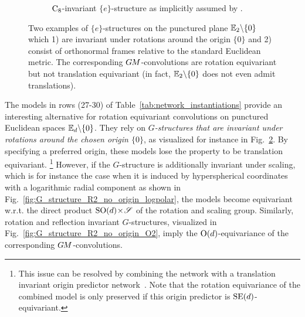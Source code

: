 \begin{figure}
\begin{subfigure}[b]{0.47\textwidth}
        \caption{\small
            $\operatorname{C}_{8}$-invariant $\{e\}$-structure as implicitly assumed by \citet{chidester2019rotation}.
        }
        \label{fig:G_structure_R2_no_origin_C8}
    \end{subfigure}
    \caption{\small
        Two examples of $\{e\}$-structures on the punctured plane $\mathbb{E}_2 \backslash \{0\}$ which
        1) are invariant under rotations around the origin $\{0\}$ and
        2) consist of orthonormal frames relative to the standard Euclidean metric.
        The corresponding $G\mkern-1.4muM$-convolutions are rotation equivariant but not translation equivariant (in fact, $\mathbb{E}_2 \backslash \{0\}$ does not even admit translations).
    }
    \label{fig:G_structures_R2_no_origin}
\end{figure}


The models in rows (27-30) of Table~\ref{tab:network_instantiations}
provide an interesting alternative for rotation equivariant convolutions on punctured Euclidean spaces $\mathbb{E}_d\backslash\{0\}$.
They rely on \emph{$G$-structures that are invariant under rotations around the chosen origin $\{0\}$}, as visualized for instance in Fig.~\ref{fig:G_structures_R2_no_origin}.
By specifying a preferred origin, these models lose the property to be translation equivariant.%
\footnote{
    This issue can be resolved by combining the network with a translation invariant origin predictor network~\cite{esteves2017polar}.
    Note that the rotation equivariance of the combined model is only preserved if this origin predictor is $\operatorname{SE}(d)$-equivariant.
}
However, if the $G$-structure is additionally invariant under scaling, which is for instance the case when it is induced by hyperspherical coordinates with a logarithmic radial component as shown in Fig.~\ref{fig:G_structure_R2_no_origin_logpolar}, the models become equivariant w.r.t. the direct product $\operatorname{SO}(d) \!\times\! \mathscr{S}$ of the rotation and scaling group.
Similarly, rotation and reflection invariant $G$-structures, visualized in Fig.~\ref{fig:G_structure_R2_no_origin_O2}, imply the $\operatorname{O}(d)$-equivariance of the corresponding $G\mkern-1.4muM$-convolutions.



